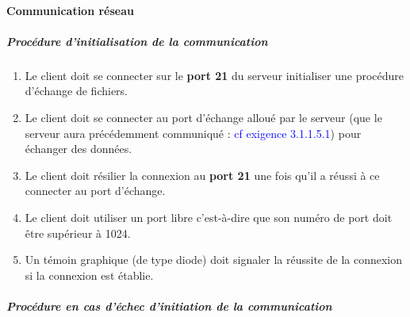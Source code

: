 \documentclass[10pt,a4paper]{report}
\begin{document}
\paragraph{Communication réseau}

	\subparagraph{Procédure d'initialisation de la communication}

		\begin{enumerate}

			\item Le client doit se connecter sur le \textbf{port 21} du serveur initialiser une procédure d'échange de fichiers.
			\item Le client doit se connecter au port d'échange alloué par le serveur (que le serveur aura précédemment communiqué : \textcolor{blue}{cf exigence 3.1.1.5.1}) pour échanger des données.
			\item Le client doit résilier la connexion au \textbf{port 21} une fois qu'il a réussi à ce connecter au port d'échange.
			\item Le client doit utiliser un port libre c'est-à-dire que son numéro de port doit être supérieur à 1024.
			\item Un témoin graphique (de type diode) doit signaler la réussite de la connexion si la connexion est établie. 
			\end{enumerate}

	\subparagraph{Procédure en cas d'échec d'initiation de la communication }
\end{document}
